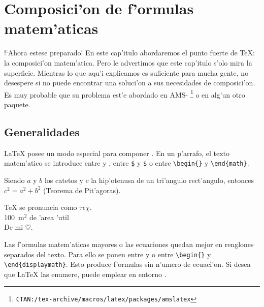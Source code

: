 
 
\chapter{Composici'on de f'ormulas matem'aticas}

\begin{intro}
  !`Ahora estese preparado! En este cap'itulo abordaremos el punto
  fuerte de \TeX: la composici'on matem'atica. Pero le advertimos que
  este cap'itulo s'olo mira la superficie. Mientras lo que aqu'i
  explicamos es suficiente para mucha gente, no desespere si no puede
  encontrar una soluci'on a sus necesidades de composici'on. Es muy
  probable que su problema est'e abordado en AMS-\LaTeXe
  \footnote{\texttt{CTAN:/tex-archive/macros/latex/packages/amslatex}}
  o en alg'un otro paquete.
\end{intro}
  
\section{Generalidades}

\LaTeX{} posee un modo especial para componer . En un
p'arrafo, el texto matem'atico se introduce entre \ci{(} y \ci{)},
 entre \texttt{\$} y \texttt{\$} o entre
\verb|\begin{|\verb|}| y \verb|\end{math}|.

\begin{example}
Siendo $a$ y $b$ los catetos
y $c$ la hip'otenusa
de un tri'angulo rect'angulo,
entonces $c^{2}=a^{2}+b^{2}$
(Teorema de Pit'agoras).
\end{example}

\begin{example}
\TeX{} se pronuncia como
 $\tau\epsilon\chi$.\\[6pt]
100~m$^{2}$ de 'area 'util \\[6pt]
De mi $\heartsuit$.
\end{example}

Las f'ormulas matem'aticas mayores o las ecuaciones quedan mejor en
renglones separados del texto. Para ello se ponen entre \ci{[} y
\ci{]} o entre \verb|\begin{|\verb|}| y
  \verb|\end{displaymath}|. Esto produce f'ormulas sin n'umero de
ecuaci'on. Si desea que \LaTeX{} las enumere, puede emplear en entorno
.

